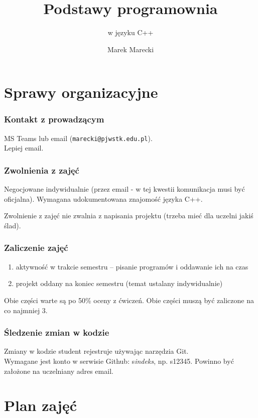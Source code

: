 \documentclass[aspectratio=169]{beamer}
\title{Podstawy programownia}
\subtitle{w języku C++}
\author{Marek Marecki}
\institute{Polsko-Japońska Akademia Technik Komputerowych}
\begin{document}
{%
    \frame{\titlepage}
}

\section{Sprawy organizacyjne}

\begin{frame}
    \frametitle{Kontakt z prowadzącym}

    MS Teams lub email ({\tt marecki@pjwstk.edu.pl}).\\
    Lepiej email.
\end{frame}

\begin{frame}
    \frametitle{Zwolnienia z zajęć}

    Negocjowane indywidualnie (przez email - w tej kwestii komunikacja musi być
    oficjalna).
    Wymagana udokumentowana znajomość języka C++.

    \vspace{1em}

    Zwolnienie z zajęć nie zwalnia z napisania projektu (trzeba mieć dla uczelni
    jakiś ślad).
\end{frame}

\begin{frame}
    \frametitle{Zaliczenie zajęć}

    \begin{enumerate}
        \item aktywność w trakcie semestru -- pisanie programów i oddawanie ich
            na czas
        \item projekt oddany na koniec semestru (temat ustalany indywidualnie)
    \end{enumerate}

    \vspace{1em}

    Obie części warte są po 50\% oceny z ćwiczeń. Obie części muszą być
    zaliczone na co najmniej 3.
\end{frame}

\begin{frame}
    \frametitle{Śledzenie zmian w kodzie}

    Zmiany w kodzie student rejestruje używając narzędzia Git.\\
    Wymagane jest konto w serwisie Github: s\emph{indeks}, np. s12345. Powinno
    być założone na uczelniany adres email.
\end{frame}

\section{Plan zajęć}
\end{document}
